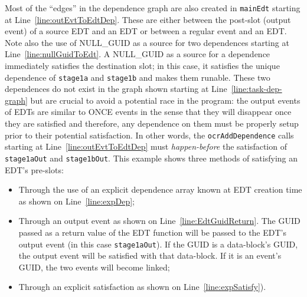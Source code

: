Most of the ``edges'' in the dependence graph are also created in
\texttt{mainEdt} starting at Line~\ref{line:outEvtToEdtDep}. These
are either between the post-slot (output event) of a source EDT and
an EDT or between a regular event and an EDT. Note also the use of
NULL\_GUID as a source for two dependences starting at
Line~\ref{line:nullGuidToEdt}. A NULL\_GUID as a source for a
dependence immediately satisfies the destination slot; in this case,
it satisfies the unique dependence of \texttt{stage1a} and
\texttt{stage1b} and makes them runable. These two dependences do not
exist in the graph shown starting at Line~\ref{line:task-dep-graph}
but are crucial to avoid a potential race in the program: the output
events of EDTs are similar to ONCE events in the sense that they will
disappear once they are satisfied and therefore, any dependence on
them must be properly setup prior to their potential satisfaction. In
other words, the \texttt{ocrAddDependence} calls starting at
Line~\ref{line:outEvtToEdtDep} must \emph{happen-before} the
satisfaction of \texttt{stage1aOut} and \texttt{stage1bOut}.
This example shows three methods of satisfying an EDT's pre-slots:
\begin{itemize}
\item{Through the use of an explicit dependence array known at EDT
    creation time as shown on Line~\ref{line:expDep};}
\item{Through an output event as shown on
    Line~\ref{line:EdtGuidReturn}. The GUID passed as a return value
    of the EDT function will be passed to the EDT's output event (in
    this case \texttt{stage1aOut}). If the GUID is a data-block's
    GUID, the output event will be satisfied with that data-block. If
    it is an event's GUID, the two events will become linked;}
\item{Through an explicit satisfaction as shown on
    Line~\ref{line:expSatisfy}).}
\end{itemize}
